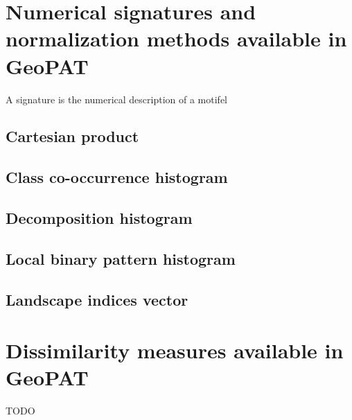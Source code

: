 \documentclass[12pt,margin=0.5in]{article}
\begin{document}
\begin{appendices}
\section{Numerical signatures and normalization methods available in GeoPAT} \label{signatures}
A signature is the numerical description of a motifel

\subsection{Cartesian product}

\subsection{Class co-occurrence histogram}

\subsection{Decomposition histogram}

\subsection{Local binary pattern histogram}

\subsection{Landscape indices vector}

\section{Dissimilarity measures available in GeoPAT}
TODO

\end{appendices}



\end{document}
